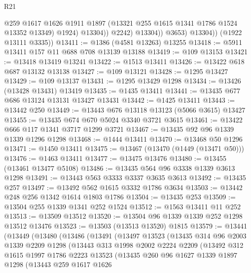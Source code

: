 \begin{lexlean}{R21}
\begin{coremodule}
                        @259
                        @1617
                        @1626
                        @1911
                        @1897
                        (@13321 @255 @1615 @1341 @1786 @1524 @13352 @13349)
                        @1924)
                      @13304))
                  @2242)
                @13304))
            @3653)
          @13304))
      (@1922 @13111 @3335))
@13411 := @1386 (@4581 @13263) @13255
@13418 := @5911 @13411 @157 @11 @688 @708 @13139 @13188
@13419 := @109 @13153
@13421 := @13418 @13419 @13241
@13422 := @1513 @13411
@13426 := @13422 @618 @687 @13132 @13138
@13427 := @109 @13121
@13428 := @1295 @13427
@13429 := @109 @13137
@13431 := @1295 @13429 @1298
@13434 := @13426 (@13428 @13431) @13419
@13435 := @1435 @13411
@13441 := @13435 @677 @686 @13124 @13131 @13427 @13431
@13442 := @1425 @13411
@13443 := @13442 @250
@13449 := @13443 @676 @13118 @13123 (@5066 @3615) @13427
@13455 := @13435 @674 @670 @5024 @3340 @3721 @3615
@13461 := @13422 @666 @117 @1341 @3717 @1299 @3721
@13467 := @13435 @92 @96 @1339 @1339 @1296 @1298
@13468 := @1444 @13411
@13470 := @13468 @50 @1296
@13471 := @1450 @13411
@13475 := @13467 (@13470 (@1449 (@13471 @50)))
@13476 := @1463 @13411
@13477 := @13475 @13476
@13480 := @13455 (@13461 @13477 @5108)
@13486 := @13435 @564 @96 @3338 @1339 @3613 @1298
@13491 := @13443 @563 @3333 @3337 @3635 @3613
@13492 := @13435 @257
@13497 := @13492 @562 @1615 @3332 @1786 @3634
@13503 := @13442 @248 @256 @1342 @1614 @1803 @1786
@13504 := @13435 @253
@13509 := @13504 @255 @1339 @1341 @252 @1524
@13512 := @1563 @13411 @11 @252
@13513 := @13509 @13512
@13520 := @13504 @96 @1339 @1339 @252 @1298 @13512 @13476
@13523 := @13503 (@13513 @13520) @1815
@13579 := @13441
    (@13449
      (@13480
        (@13486
          (@13491
            (@13497
              @13523
              (@13435
                @314
                @96
                @2003
                @1339
                @2209
                @1298
                (@13443
                  @313
                  @1998
                  @2002
                  @2224
                  @2209
                  (@13492
                    @312
                    @1615
                    @1997
                    @1786
                    @2223
                    @13523
                    (@13435
                      @260
                      @96
                      @1627
                      @1339
                      @1897
                      @1298
                      (@13443
                        @259
                        @1617
                        @1626

\end{coremodule}
\end{lexlean}
